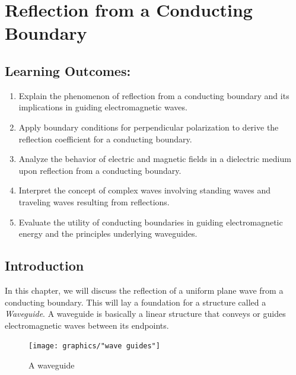 \chapter{Reflection from a Conducting Boundary}\label{lec:lec34}

\section{Learning Outcomes:}
\begin{mdframed}[backgroundcolor=lightblue, linewidth=1pt, hidealllines=true]
    \begin{enumerate}[label=\roman*., itemsep=0pt, topsep=0pt]
        \item Explain the phenomenon of reflection from a conducting boundary and its implications in guiding electromagnetic waves.
        \item Apply boundary conditions for perpendicular polarization to derive the reflection coefficient for a conducting boundary.
        \item Analyze the behavior of electric and magnetic fields in a dielectric medium upon reflection from a conducting boundary.
        \item Interpret the concept of complex waves involving standing waves and traveling waves resulting from reflections.
        \item Evaluate the utility of conducting boundaries in guiding electromagnetic energy and the principles underlying waveguides.
    \end{enumerate}
\end{mdframed}

\section{Introduction}

In this chapter, we will discuss the reflection of a uniform plane wave from a conducting boundary. This will lay a foundation for a structure called a \emph{Waveguide}. A waveguide is basically a linear structure that conveys or guides electromagnetic waves between its endpoints.
\begin{figure}[h]
\centering
\texttt{[image: graphics/"wave guides"]}
\caption{A waveguide}
\end{figure}

